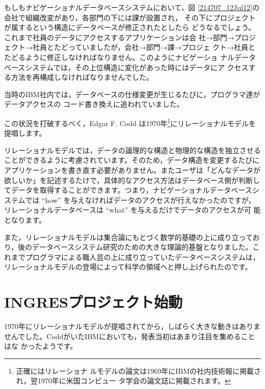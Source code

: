 もしもナビゲーショナルデータベースシステムにおいて，図
\ref{214707_12Jul12}の会社で組織改変があり，各部門の下には課が設置され，
その下にプロジェクトが属するという構造にデータベースが修正されたとしたら
どうなるでしょう。これまで社員のデータにアクセスするアプリケーションは会
社→部門→プロジェクト→社員とたどっていましたが，会社→部門→課→プロジェ
クト→社員とたどるように修正しなければなりません。このようにナビゲーショ
ナルデータベースシステムでは，その上位構造に変化があった時にはデータにア
クセスする方法を再構成しなければなりませんでした。


当時のIBM社内では，データベースの仕様変更が生じるたびに，プログラマ達がデータアクセスの
コード書き換えに追われていました。


この状況を打破するべく，Edgar F. Codd は1970年\footnote{正確にはリレーショナ
ルモデルの論文は1969年にIBMの社内技術報に掲載され，翌1970年に米国コンピュー
タ学会の論文誌に掲載されます。}にリレーショナルモデルを提唱します。


リレーショナルモデルでは，データの論理的な構造と物理的な構造を独立させる
ことができるように考慮されています。そのため，データ構造を変更するたびに
アプリケーションを書き直す必要がありません。またユーザは「どんなデータが
欲しいか」を記述するたけで，具体的なアクセス方法はデータベース側が判断し
てデータを取得することができます。つまり，ナビゲーショナルデータベースシ
ステムでは ``how'' を与えなければデータのアクセスが行えなかったのですが，
リレーショナルデータベースは ``what'' を与えるだけでデータのアクセスが可
能となります。


また，リレーショナルモデルは集合論にもとづく数学的基礎の上に成り立ってお
り，後のデータベースシステム研究のための大きな理論的基盤となりました。こ
れまでプログラマによる職人芸の上に成り立っていたデータベースシステムは，
リレーショナルモデルの登場によって科学の領域へと押し上げられたのです。


\section{INGRESプロジェクト始動}


1970年にリレーショナルモデルが提唱されてから，しばらく大きな動きはありま
せんでした。CoddがいたIBMにおいても，発表当初はあまり注目を集めることはな
かったようです。

